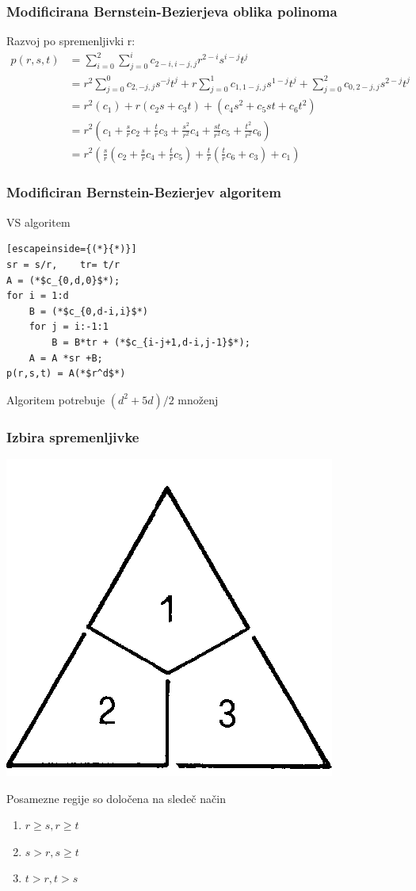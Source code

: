 \documentclass{beamer}
\begin{document}
\begin{frame}
\frametitle{Modificirana Bernstein-Bezierjeva oblika polinoma}
Razvoj po spremenljivki r:
\begin{align}
p(r,s,t) &= \sum_{i=0}^{2}\sum_{j=0}^{i}c_{2-i,i-j,j}r^{2-i}s^{i-j}t^j \nonumber \\ \nonumber
&= r^2\sum_{j=0}^{0}c_{2,-j,j}s^{-j}t^j + r\sum_{j=0}^{1}c_{1,1-j,j}s^{1-j}t^j + \sum_{j=0}^{2}c_{0,2-j,j}s^{2-j}t^j \\ \nonumber
&= r^2(c_1) + r(c_2s+c_3t) + (c_4s^2+c_5st+c_6t^2)\\ \nonumber
&= r^2(c_1+\frac{s}{r}c_2+\frac{t}{r}c_3+\frac{s^2}{r^2}c_4+\frac{st}{r^2}c_5+\frac{t^2}{r^2}c_6) \\ \nonumber
&= r^2(\frac{s}{r}(c_2+\frac{s}{r}c_4+\frac{t}{r}c_5)+\frac{t}{r}(\frac{t}{r}c_6+c_3)+c_1) \nonumber
\end{align}
\end{frame}

\begin{frame}[fragile]
\frametitle{Modificiran Bernstein-Bezierjev algoritem}
\begin{block}{VS algoritem}
\begin{lstlisting}[escapeinside={(*}{*)}]
sr = s/r,	 tr= t/r
A = (*$c_{0,d,0}$*);
for i = 1:d
    B = (*$c_{0,d-i,i}$*)
    for j = i:-1:1
        B = B*tr + (*$c_{i-j+1,d-i,j-1}$*);
    A = A *sr +B;
p(r,s,t) = A(*$r^d$*)
\end{lstlisting}
\end{block}
Algoritem potrebuje $(d^2+5d)/2$ množenj


\end{frame}

\begin{frame}
\frametitle{Izbira spremenljivke}
\begin{center}
\includegraphics[width=.3\linewidth]{graf1.png}
\end{center}

Posamezne regije so določena na sledeč način
\begin{enumerate}
\item  $r \geq s, r \geq t$
\item $s > r, s \geq t$
\item $t>r, t>s$
\end{enumerate}

\end{frame}
\end{document}
